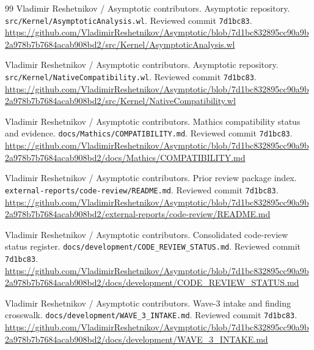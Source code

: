 \documentclass[11pt,letterpaper]{article}
\newcommand{\code}[1]{\nolinkurl{#1}}
\begin{document}
\begin{thebibliography}{99}
\small
\setlength{\itemsep}{1pt}
\setlength{\parskip}{0pt}
\setlength{\parsep}{0pt}
 Vladimir Reshetnikov / Asymptotic contributors. Asymptotic repository.\newline
\code{src/Kernel/AsymptoticAnalysis.wl}. Reviewed commit \code{7d1bc83}.\newline
\url{https://github.com/VladimirReshetnikov/Asymptotic/blob/7d1bc832895cc90a9b2a978b7b7684acab908bd2/src/Kernel/AsymptoticAnalysis.wl}

 Vladimir Reshetnikov / Asymptotic contributors. Asymptotic repository.\newline
\code{src/Kernel/NativeCompatibility.wl}. Reviewed commit \code{7d1bc83}.\newline
\url{https://github.com/VladimirReshetnikov/Asymptotic/blob/7d1bc832895cc90a9b2a978b7b7684acab908bd2/src/Kernel/NativeCompatibility.wl}

 Vladimir Reshetnikov / Asymptotic contributors. Mathics compatibility status and evidence.\newline
\code{docs/Mathics/COMPATIBILITY.md}. Reviewed commit \code{7d1bc83}.\newline
\url{https://github.com/VladimirReshetnikov/Asymptotic/blob/7d1bc832895cc90a9b2a978b7b7684acab908bd2/docs/Mathics/COMPATIBILITY.md}

 Vladimir Reshetnikov / Asymptotic contributors. Prior review package index.\newline
\code{external-reports/code-review/README.md}. Reviewed commit \code{7d1bc83}.\newline
\url{https://github.com/VladimirReshetnikov/Asymptotic/blob/7d1bc832895cc90a9b2a978b7b7684acab908bd2/external-reports/code-review/README.md}

 Vladimir Reshetnikov / Asymptotic contributors. Consolidated code-review status register.\newline
\code{docs/development/CODE_REVIEW_STATUS.md}. Reviewed commit \code{7d1bc83}.\newline
\url{https://github.com/VladimirReshetnikov/Asymptotic/blob/7d1bc832895cc90a9b2a978b7b7684acab908bd2/docs/development/CODE_REVIEW_STATUS.md}

 Vladimir Reshetnikov / Asymptotic contributors. Wave-3 intake and finding crosswalk.\newline
\code{docs/development/WAVE_3_INTAKE.md}. Reviewed commit \code{7d1bc83}.\newline
\url{https://github.com/VladimirReshetnikov/Asymptotic/blob/7d1bc832895cc90a9b2a978b7b7684acab908bd2/docs/development/WAVE_3_INTAKE.md}


\end{thebibliography}
\end{document}

